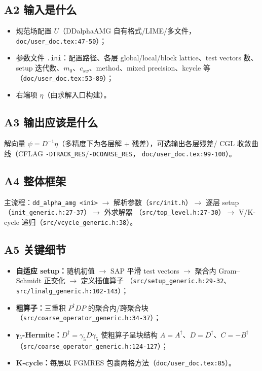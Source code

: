 \documentclass[UTF8]{ctexart}
\begin{document}
\subsection{A2 输入是什么}
\begin{itemize}
  \item 规范场配置 $U$（DDalphaAMG 自有格式/LIME/多文件，\texttt{doc/user\_doc.tex:47-50}）；
  \item 参数文件 \texttt{.ini}：配置路径、各层 global/local/block lattice、test vectors 数、
        setup 迭代数、$m_0$、$c_{sw}$、method、mixed precision、kcycle 等
        （\texttt{doc/user\_doc.tex:53-89}）；
  \item 右端项 $\eta$（由求解入口构建）。
\end{itemize}

\subsection{A3 输出应该是什么}
解向量 $\psi = D^{-1}\eta$（多精度下为各层解 + 残差），可选输出各层残差/
CGL 收敛曲线（CFLAG \texttt{-DTRACK\_RES}/\texttt{-DCOARSE\_RES}，
\texttt{doc/user\_doc.tex:99-100}）。

\subsection{A4 整体框架}
主流程：\texttt{dd\_alpha\_amg <ini>} $\rightarrow$ 解析参数（\texttt{src/init.h}）$\rightarrow$
逐层 setup（\texttt{init\_generic.h:27-37}）$\rightarrow$ 外求解器
（\texttt{src/top\_level.h:27-30}）$\rightarrow$ V/K-cycle 递归（\texttt{src/vcycle\_generic.h:38}）。

\subsection{A5 关键细节}
\begin{itemize}
  \item \textbf{自适应 setup：}随机初值 $\rightarrow$ SAP 平滑 test vectors $\rightarrow$
        聚合内 Gram--Schmidt 正交化 $\rightarrow$ 定义插值算子
        （\texttt{src/setup\_generic.h:29-32}、\texttt{src/linalg\_generic.h:102-143}）；
  \item \textbf{粗算子：}三重积 $P^\dagger D P$ 的聚合内/跨聚合块
        （\texttt{src/coarse\_operator\_generic.h:34-37}）；
  \item \textbf{γ$_5$-Hermite：}$D^\dagger=\gamma_5 D\gamma_5$ 使粗算子呈块结构
        $A=A^\dagger$、$D=D^\dagger$、$C=-B^\dagger$
        （\texttt{\nolinkurl{src/coarse_operator_generic.h:124-127}}）；
  \item \textbf{K-cycle：}每层以 FGMRES 包裹两格方法（\texttt{doc/user\_doc.tex:85}）。
\end{itemize}
\end{document}
